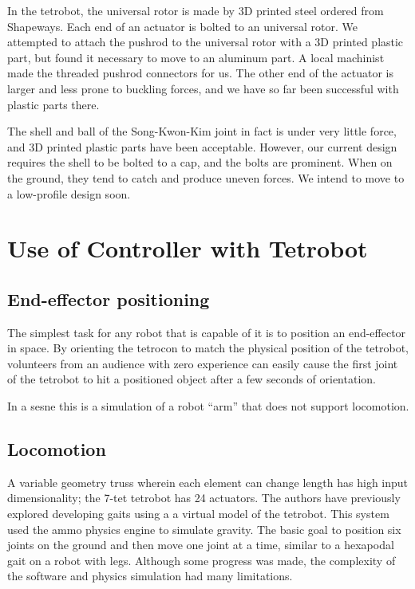 \documentclass[conference]{article}
\begin{document}
In the tetrobot, the universal rotor is made by 3D printed steel ordered from Shapeways. Each
end of an actuator is bolted to an universal rotor. We attempted to attach the pushrod to the
universal rotor with a 3D printed plastic part, but found it necessary to move to an aluminum part.
A local machinist made the threaded pushrod connectors for us. The other end of the actuator is
larger and less prone to buckling forces, and we have so far been successful with plastic parts there.

The shell and ball of the Song-Kwon-Kim joint in fact is under very little force, and 3D printed
plastic parts have been acceptable. However, our current design requires the shell to be bolted
to a cap, and the bolts are prominent. When on the ground, they tend to catch and produce uneven
forces. We intend to move to a low-profile design soon.


 \section{Use of Controller with Tetrobot}

 \subsection{End-effector positioning}

 The simplest task for any robot that is capable of it is to position
 an end-effector in space. By orienting the tetrocon to match
 the physical position of the tetrobot, volunteers from an audience
 with zero experience can easily cause the first joint of the tetrobot
 to hit a positioned object after a few seconds of orientation.

 In a sesne this is a simulation of a robot ``arm'' that does not
 support locomotion.

 \subsection{Locomotion}

 A variable geometry truss wherein each element can change length
 has high input dimensionality; the 7-tet tetrobot has 24 actuators.
 The authors have previously explored developing gaits using a
 a virtual model of the tetrobot. This system used the ammo
 physics engine to simulate gravity. The basic goal to position
 six joints on the ground and then move one joint at a time,
 similar to a hexapodal gait on a robot with legs. Although
 some progress was made, the complexity of the software and
 physics simulation had many limitations.
\end{document}
